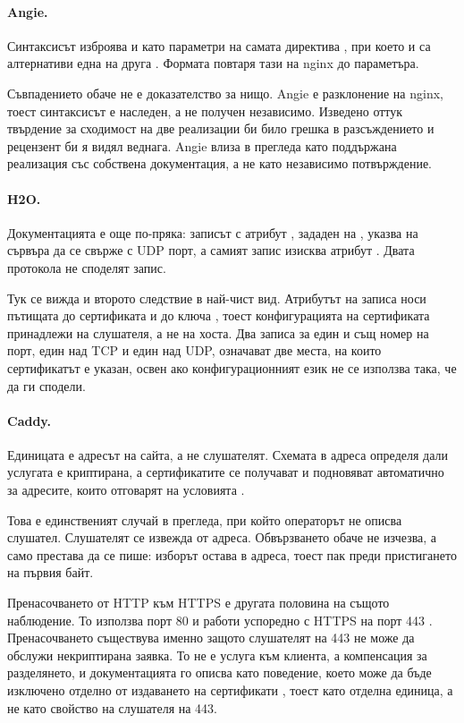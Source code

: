 \paragraph{Angie.} Синтаксисът изброява  и  като параметри на самата
директива , при което  и  са алтернативи една на друга
\cite{angielisten}. Формата повтаря тази на nginx до параметъра.

Съвпадението обаче не е доказателство за нищо. Angie е разклонение на nginx, тоест
синтаксисът е наследен, а не получен независимо. Изведено оттук твърдение за сходимост на
две реализации би било грешка в разсъждението и рецензент би я видял веднага. Angie влиза в
прегледа като поддържана реализация със собствена документация, а не като независимо
потвърждение.

\paragraph{H2O.} Документацията е още по-пряка: записът  с атрибут ,
зададен на , указва на сървъра да се свърже с UDP порт, а самият запис изисква
атрибут  \cite{h2oquic}. Двата протокола не споделят запис.

Тук се вижда и второто следствие в най-чист вид. Атрибутът  на записа носи пътищата
до сертификата и до ключа \cite{h2olisten}, тоест конфигурацията на сертификата принадлежи на
слушателя, а не на хоста. Два записа за един и същ номер на порт, един над TCP и един над UDP,
означават две места, на които сертификатът е указан, освен ако конфигурационният език не се
използва така, че да ги сподели.

\paragraph{Caddy.} Единицата е адресът на сайта, а не слушателят. Схемата в адреса определя
дали услугата е криптирана, а сертификатите се получават и подновяват автоматично за адресите,
които отговарят на условията \cite{caddyhttps}.

Това е единственият случай в прегледа, при който операторът не описва слушател. Слушателят се
извежда от адреса. Обвързването обаче не изчезва, а само престава да се пише: изборът остава
в адреса, тоест пак преди пристигането на първия байт.

Пренасочването от HTTP към HTTPS е другата половина на същото наблюдение. То използва порт 80
и работи успоредно с HTTPS на порт 443 \cite{caddyhttps}. Пренасочването съществува именно
защото слушателят на 443 не може да обслужи некриптирана заявка. То не е услуга към клиента, а
компенсация за разделянето, и документацията го описва като поведение, което може да бъде
изключено отделно от издаването на сертификати \cite{caddyhttps}, тоест като отделна единица,
а не като свойство на слушателя на 443.

